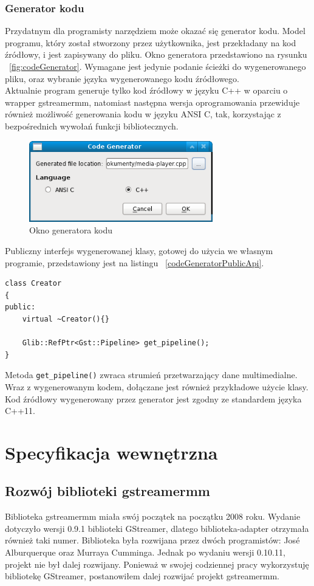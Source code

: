 \documentclass[12pt]{article}
\begin{document}
\subsubsection{Generator kodu}
Przydatnym dla programisty narzędziem może okazać się generator kodu. Model programu, który został stworzony przez użytkownika, jest przekładany na kod źródłowy, i jest zapisywany do pliku. Okno generatora przedstawiono na rysunku ~\ref{fig:codeGenerator}. Wymagane jest jedynie podanie ścieżki do wygenerowanego pliku, oraz wybranie języka wygenerowanego kodu źródłowego.\\
Aktualnie program generuje tylko kod źródłowy w języku C++ w oparciu o wrapper gstreamermm, natomiast następna wersja oprogramowania przewiduje również możliwość generowania kodu w języku ANSI C, tak, korzystając z bezpośrednich wywołań funkcji bibliotecznych.\\
\begin{figure}[H]
  \includegraphics[width=80mm]{img/code-generator.png}
  \caption{Okno generatora kodu}
  \label{fig:pluginWizzard}
\end{figure}
Publiczny interfejs wygenerowanej klasy, gotowej do użycia we własnym programie, przedstawiony jest na listingu ~\ref{codeGeneratorPublicApi}.
\begin{lstlisting}[caption=Publiczny interfejs klasy stworzonej przez generator kodu, label=codeGeneratorPublicApi]
class Creator
{
public:
	virtual ~Creator(){}

	Glib::RefPtr<Gst::Pipeline> get_pipeline();
}
\end{lstlisting}
Metoda \texttt{get\_pipeline()} zwraca strumień przetwarzający dane multimedialne.\\
Wraz z wygenerowanym kodem, dołączane jest również przykładowe użycie klasy.\\
Kod źródłowy wygenerowany przez generator jest zgodny ze standardem języka C++11.
\cleardoublepage
\section{Specyfikacja wewnętrzna}
\subsection{Rozwój biblioteki gstreamermm}
Biblioteka gstreamermm miała swój początek na początku 2008 roku. Wydanie dotyczyło wersji 0.9.1 biblioteki GStreamer, dlatego biblioteka-adapter otrzymała również taki numer. Biblioteka była rozwijana przez dwóch programistów: José Alburquerque oraz Murraya Cumminga. Jednak po wydaniu wersji 0.10.11, projekt nie był dalej rozwijany. Ponieważ w swojej codziennej pracy wykorzystuję bibliotekę GStreamer, postanowiłem dalej rozwijać projekt gstreamermm.
\end{document}

